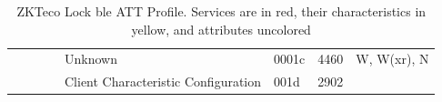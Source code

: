 \documentclass[conference]{IEEEtran}
\begin{document}
\begin{landscape}
\begin{table}[ht]
\begin{tabular}{@{}llllllll@{}}
                            &                             &                              &                              & Unknown                                                                                & 0001c                    & 4460                             & W, W(xr), N                                                                                                        \\
                            &                             &                              &                              & Client Characteristic Configuration                                                    & 001d                     & 2902                             &                                                                                                                    \\ \bottomrule
\end{tabular}
\caption{ZKTeco Lock \gls{ble} ATT Profile.  Services are in red, their characteristics in yellow, and attributes uncolored}
\label{tab:att}
\end{table}
\end{landscape}


%
\ifCLASSINFOpdf
\else
\fi
%
%
\end{document}
